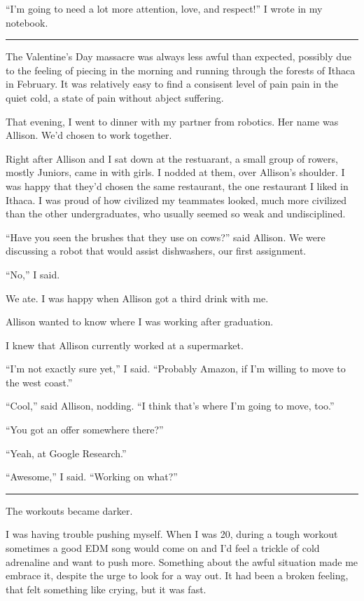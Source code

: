 ``I'm going to need a lot more attention, love, and respect!'' I wrote in my
notebook. 

\plainfancybreak{12pt}{2}{* * *}

The Valentine's Day massacre was always less awful than expected, possibly due
to the feeling of piecing in the morning and running through the forests of
Ithaca in February.  It was relatively easy to find a consisent level of pain
pain in the quiet cold, a state of pain without abject suffering. 

That evening, I went to dinner with my partner from robotics.  Her name was
Allison.  We'd chosen to work together.  

Right after Allison and I sat down at the restuarant, a small group of rowers,
mostly Juniors, came in with girls.  I nodded at them, over Allison's shoulder.
I was happy that they'd chosen the same restaurant, the one restaurant I liked
in Ithaca.  I was proud of how civilized my teammates looked, much more
civilized than the other undergraduates, who usually seemed so weak and
undisciplined.

``Have you seen the brushes that they use on cows?'' said Allison.  We were
discussing a robot that would assist dishwashers, our first assignment.

``No,'' I said.

We ate.  I was happy when Allison got a third drink with me.

Allison wanted to know where I was working after graduation.

I knew that Allison currently worked at a supermarket. 

``I'm not exactly sure yet,'' I said.  ``Probably Amazon, if I'm willing to move
to the west coast.''

``Cool,'' said Allison, nodding.  ``I think that's where I'm going to move,
too.''

``You got an offer somewhere there?''

``Yeah, at Google Research.''

``Awesome,'' I said.  ``Working on what?''

\plainfancybreak{12pt}{2}{* * *}

The workouts became darker.  

I was having trouble pushing myself.  When I was 20, during a tough workout
sometimes a good EDM song would come on and I'd feel a trickle of cold
adrenaline and want to push more.  Something about the awful situation made me
embrace it, despite the urge to look for a way out.  It had been a broken
feeling, that felt something like crying, but it was fast.

